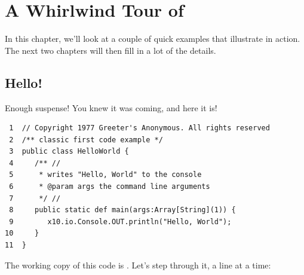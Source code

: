 \chapter{A Whirlwind Tour of \Xten{}}
In this chapter, we'll look at a couple of quick examples that illustrate
\Xten{} in action. The next two chapters will then fill in a lot of the details.
\section{Hello!}

Enough suspense! You knew it was coming, and here it is!
\begin{verbatim}
 1  // Copyright 1977 Greeter's Anonymous. All rights reserved 
 2  /** classic first code example */ 
 3  public class HelloWorld { 
 4     /** //
 5      * writes "Hello, World" to the console 
 6      * @param args the command line arguments 
 7      */ //
 8     public static def main(args:Array[String](1)) { 
 9        x10.io.Console.OUT.println("Hello, World"); 
10     }
11  }
\end{verbatim}
The working copy of this code is 
\href{http://dist.codehaus.org/x10/documentation/guide/src/hello/HelloWorld.x10}{}.
Let's step through it, a line at a time:

